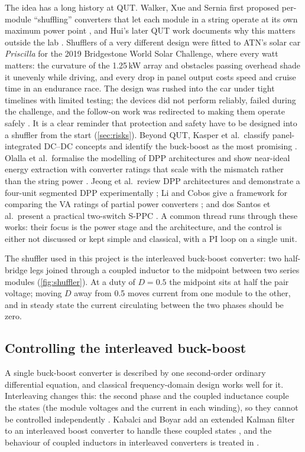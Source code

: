 The idea has a long history at QUT. Walker, Xue and Sernia first proposed per-module ``shuffling'' converters that let each module in a string operate at its own maximum power point \cite{walker_pv_2003}, and Hui's later QUT work documents why this matters outside the lab \cite{hui_development_2020}. Shufflers of a very different design were fitted to ATN's solar car \emph{Priscilla} for the 2019 Bridgestone World Solar Challenge, where every watt matters: the curvature of the 1.25\,kW array and obstacles passing overhead shade it unevenly while driving, and every drop in panel output costs speed and cruise time in an endurance race. The design was rushed into the car under tight timelines with limited testing; the devices did not perform reliably, failed during the challenge, and the follow-on work was redirected to making them operate safely \cite{hui_development_2020}. It is a clear reminder that protection and safety have to be designed into a shuffler from the start (\cref{sec:risks}). Beyond QUT, Kasper et al.\ classify panel-integrated DC--DC concepts and identify the buck-boost as the most promising \cite{kasper_classification_2014,kasper_impact_2014}. Olalla et al.\ formalise the modelling of DPP architectures and show near-ideal energy extraction with converter ratings that scale with the mismatch rather than the string power \cite{olalla_modeling_2014,olalla_performance_2014}. Jeong et al.\ review DPP architectures \cite{jeong_review_2018} and demonstrate a four-unit segmented DPP experimentally \cite{jeong_segmented_2020}; Li and Cobos give a framework for comparing the VA ratings of partial power converters \cite{li_classification_2021}; and dos Santos et al.\ present a practical two-switch S-PPC \cite{dos_santos_two-switch_2021}. A common thread runs through these works: their focus is the power stage and the architecture, and the control is either not discussed or kept simple and classical, with a PI loop on a single unit.

The shuffler used in this project is the interleaved buck-boost converter: two half-bridge legs joined through a coupled inductor to the midpoint between two series modules (\cref{fig:shuffler}). At a duty of $D=0.5$ the midpoint sits at half the pair voltage; moving $D$ away from 0.5 moves current from one module to the other, and in steady state the current circulating between the two phases should be zero.

\subsection{Controlling the interleaved buck-boost}
\label{sec:lit_control}
A single buck-boost converter is described by one second-order ordinary differential equation, and classical frequency-domain design works well for it. Interleaving changes this: the second phase and the coupled inductance couple the states (the module voltages and the current in each winding), so they cannot be controlled independently \cite{milasi_robust_2024}. Kabalci and Boyar add an extended Kalman filter to an interleaved boost converter to handle these coupled states \cite{kabalci_highly_2022}, and the behaviour of coupled inductors in interleaved converters is treated in \cite{huang_high-frequency_2015,guacci_experimental_2019}.

